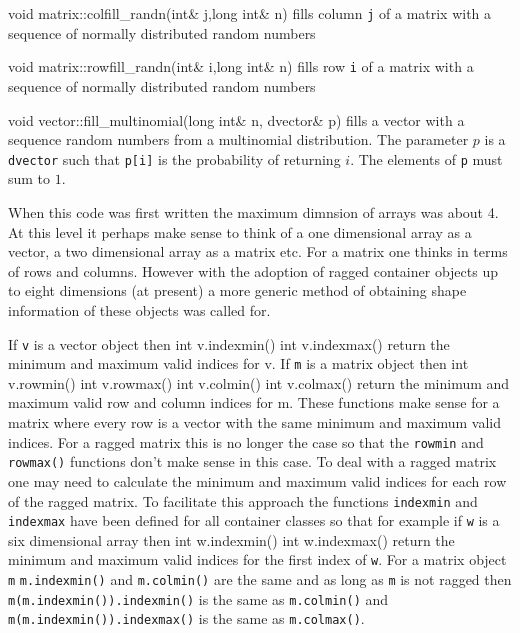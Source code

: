 \beginexample
void matrix::colfill_randn(int& j,long int& n)
\endexample
\noindent fills column {\tt j} of a matrix with a sequence of normally 
distributed random numbers

\beginexample
void matrix::rowfill_randn(int& i,long int& n)
\endexample
\noindent fills row {\tt i} of a matrix with a sequence of normally 
distributed random numbers

  
\beginexample
void vector::fill_multinomial(long int& n, dvector& p)
\endexample
\noindent fills a vector with a sequence random numbers from
a multinomial distribution. The parameter $p$ is a {\tt dvector} such that
{\tt p[i]} is the probability of returning $i$. The elements of {\tt p}
must sum to $1$.

When this code was first written the maximum dimnsion of arrays
was about 4. At this level it perhaps make sense to think of
a one dimensional array as a vector, a two dimensional array as
a matrix etc. For a matrix one thinks in terms of rows and columns.
However with the adoption of ragged container objects up to
eight dimensions (at present) a more generic method of obtaining
shape information of these objects was called for.

If {\tt v} is a vector object then
\beginexample
int v.indexmin()
int v.indexmax()
\endexample
\noindent
return the minimum and maximum valid indices for v.
If {\tt m} is a matrix object then
\beginexample
int v.rowmin()
int v.rowmax()
int v.colmin()
int v.colmax()
\endexample
\noindent
return the minimum and maximum valid row and column indices
for m. These functions make sense for a matrix where every
row is a vector with the same minimum and maximum valid
indices.  For a ragged matrix this is no longer the case so that
the {\tt rowmin} and {\tt rowmax()} functions don't make sense
in this case. To deal with a ragged matrix one may need to calculate
the minimum and maximum valid indices for each row of the ragged matrix. 
To facilitate this approach the functions {\tt indexmin} and 
{\tt indexmax} have been defined for all container classes so that
for example if {\tt w} is a six dimensional array then
\beginexample
int w.indexmin()
int w.indexmax()
\endexample
return the minimum and maximum valid indices for the first
index of {\tt w}. For a matrix object {\tt m} 
{\tt m.indexmin()} and {\tt m.colmin()} are the same
and as long as {\tt m} is not ragged then
{\tt m(m.indexmin()).indexmin()} is the same as {\tt m.colmin()}
and {\tt m(m.indexmin()).indexmax()} is the same as {\tt m.colmax()}.


